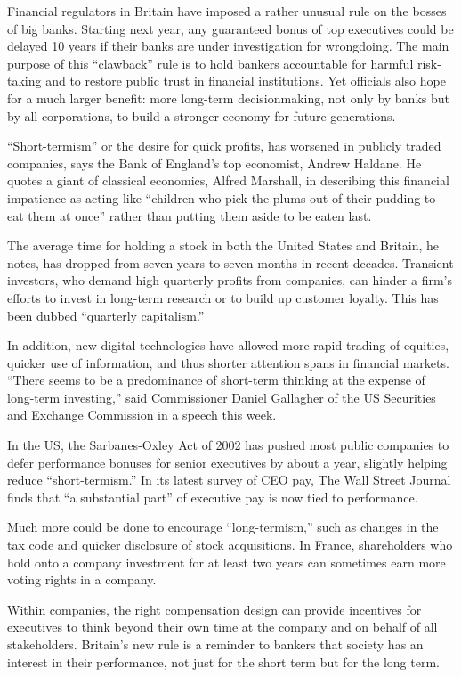 Financial regulators in Britain have imposed a rather unusual rule on the bosses of big banks. Starting next year, any guaranteed bonus of top executives could be delayed 10 years if their banks are under investigation for wrongdoing. The main purpose of this ``clawback'' rule is to hold bankers accountable for harmful risk-taking and to restore public trust in financial institutions. Yet officials also hope for a much larger benefit: more long-term decisionmaking, not only by banks but by all corporations, to build a stronger economy for future generations.


``Short-termism'' or the desire for quick profits, has worsened in publicly traded companies, says the Bank of England's top economist, Andrew Haldane. He quotes a giant of classical economics, Alfred Marshall, in describing this financial impatience as acting like ``children who pick the plums out of their pudding to eat them at once'' rather than putting them aside to be eaten last.


The average time for holding a stock in both the United States and Britain, he notes, has dropped from seven years to seven months in recent decades. Transient investors, who demand high quarterly profits from companies, can hinder a firm's efforts to invest in long-term research or to build up customer loyalty. This has been dubbed ``quarterly capitalism.''


In addition, new digital technologies have allowed more rapid trading of equities, quicker use of information, and thus shorter attention spans in financial markets. ``There seems to be a predominance of short-term thinking at the expense of long-term investing,'' said Commissioner Daniel Gallagher of the US Securities and Exchange Commission in a speech this week.


In the US, the Sarbanes-Oxley Act of 2002 has pushed most public companies to defer performance bonuses for senior executives by about a year, slightly helping reduce ``short-termism.'' In its latest survey of CEO pay, The Wall Street Journal finds that ``a substantial part'' of executive pay is now tied to performance.


Much more could be done to encourage ``long-termism,'' such as changes in the tax code and quicker disclosure of stock acquisitions. In France, shareholders who hold onto a company investment for at least two years can sometimes earn more voting rights in a company.


Within companies, the right compensation design can provide incentives for executives to think beyond their own time at the company and on behalf of all stakeholders. Britain's new rule is a reminder to bankers that society has an interest in their performance, not just for the short term but for the long term.